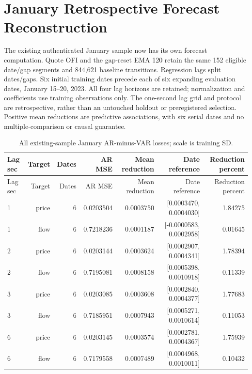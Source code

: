 \documentclass[10pt]{article}
\begin{document}
\section{January Retrospective Forecast Reconstruction}
The existing authenticated January sample now has its own forecast computation. Quote OFI and the gap-reset EMA 120 retain the same 152 eligible date/gap segments and 844,621 baseline transitions. Regression lags split dates/gaps. Six initial training dates precede each of six expanding evaluation dates, January 15--20, 2023. All four lag horizons are retained; normalization and coefficients use training observations only. The one-second lag grid and protocol are retrospective, rather than an untouched holdout or preregistered selection. Positive mean reductions are predictive associations, with six serial dates and no multiple-comparison or causal guarantee.


\small\setlength{\tabcolsep}{3pt}
\begin{longtable}{lrrrrrr}
\caption{All existing-sample January AR-minus-VAR losses; scale is training SD.}\label{tab:january_forecast_all_lags}\\
\toprule
Lag sec & Target & Dates & AR MSE & Mean reduction & Date reference & Reduction percent \\\midrule\endfirsthead
\toprule
Lag sec & Target & Dates & AR MSE & Mean reduction & Date reference & Reduction percent \\\midrule\endhead
1 & price & 6 & 0.0203504 & 0.0003750 & [0.0003470, 0.0004030] & 1.84275 \\
1 & flow & 6 & 0.7218236 & 0.0001187 & [-0.0000583, 0.0002958] & 0.01645 \\
2 & price & 6 & 0.0203144 & 0.0003624 & [0.0002907, 0.0004341] & 1.78394 \\
2 & flow & 6 & 0.7195081 & 0.0008158 & [0.0005398, 0.0010918] & 0.11339 \\
3 & price & 6 & 0.0203085 & 0.0003608 & [0.0002840, 0.0004377] & 1.77683 \\
3 & flow & 6 & 0.7185951 & 0.0007943 & [0.0005271, 0.0010614] & 0.11053 \\
6 & price & 6 & 0.0203145 & 0.0003574 & [0.0002781, 0.0004367] & 1.75939 \\
6 & flow & 6 & 0.7179558 & 0.0007489 & [0.0004968, 0.0010011] & 0.10432 \\
\bottomrule\end{longtable}\normalsize
\end{document}
